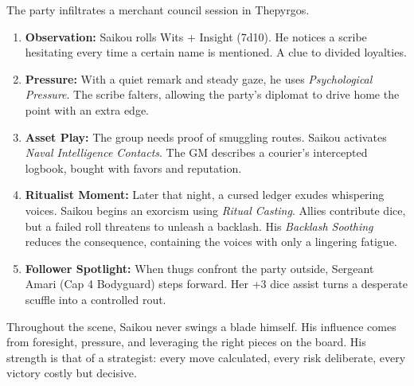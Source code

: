 \documentclass[11pt]{article}
\begin{document}
\begin{tcolorbox}[title=Fictional Snapshot: Captain Saikou Ira in Play,colback=gray!5,colframe=black!60!white]
The party infiltrates a merchant council session in Thepyrgos.
\begin{enumerate}
  \item \textbf{Observation:} Saikou rolls Wits + Insight (7d10). He notices a scribe hesitating every time a certain name is mentioned. A clue to divided loyalties.
  \item \textbf{Pressure:} With a quiet remark and steady gaze, he uses \emph{Psychological Pressure}. The scribe falters, allowing the party's diplomat to drive home the point with an extra edge.
  \item \textbf{Asset Play:} The group needs proof of smuggling routes. Saikou activates \emph{Naval Intelligence Contacts}. The GM describes a courier’s intercepted logbook, bought with favors and reputation.
  \item \textbf{Ritualist Moment:} Later that night, a cursed ledger exudes whispering voices. Saikou begins an exorcism using \emph{Ritual Casting}. Allies contribute dice, but a failed roll threatens to unleash a backlash. His \emph{Backlash Soothing} reduces the consequence, containing the voices with only a lingering fatigue.
  \item \textbf{Follower Spotlight:} When thugs confront the party outside, Sergeant Amari (Cap 4 Bodyguard) steps forward. Her +3 dice assist turns a desperate scuffle into a controlled rout.
\end{enumerate}
Throughout the scene, Saikou never swings a blade himself. His influence comes from foresight, pressure, and leveraging the right pieces on the board. His strength is that of a strategist: every move calculated, every risk deliberate, every victory costly but decisive.
\end{tcolorbox}
\end{document}
